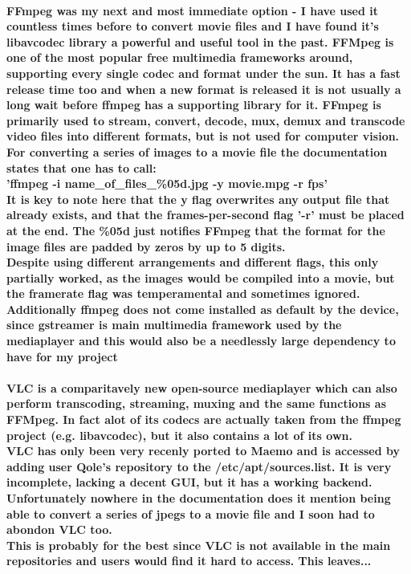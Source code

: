 \documentclass[11pt]{article} %
\begin{document}
\paragraph{FFmpeg was my next and most immediate option - I have used it countless times before to convert movie files and I have found it's libavcodec library a powerful and useful tool in the past. FFMpeg is one of the most popular free multimedia frameworks around, supporting every single codec and format under the sun. It has a fast release time too and when a new format is released it is not usually a long wait before ffmpeg has a supporting library for it. FFmpeg is primarily used to stream, convert, decode, mux, demux and transcode video files into different formats, but is not used for computer vision.\\
For converting a series of images to a movie file the documentation states that one has to call:\\
'ffmpeg -i name\_of\_files\_\%05d.jpg -y movie.mpg -r fps'\\
It is key to note here that the y flag overwrites any output file that already exists, and that the frames-per-second flag '-r' must be placed at the end. The \%05d just notifies FFmpeg that the format for the image files are padded by zeros by up to 5 digits.\\
Despite using different arrangements and different flags, this only partially worked, as the images would be compiled into a movie, but the framerate flag was temperamental and sometimes ignored.\\
Additionally ffmpeg does not come installed as default by the device, since gstreamer is main multimedia framework used by the mediaplayer and this would also be a needlessly large dependency to have for my project
}
\paragraph{VLC is a comparitavely new open-source mediaplayer which can also perform transcoding, streaming, muxing and the same functions as FFMpeg. In fact alot of its codecs are actually taken from the ffmpeg project (e.g. libavcodec), but it also contains a lot of its own.\\
VLC has only been very recenly ported to Maemo and is accessed by adding user Qole's repository to the /etc/apt/sources.list. It is very incomplete, lacking a decent GUI, but it has a working backend. Unfortunately nowhere in the documentation does it mention being able to convert a series of jpegs to a movie file and I soon had to abondon VLC too.\\ This is probably for the best since VLC is not available in the main repositories and users would find it hard to access. This leaves...}
\end{document}
